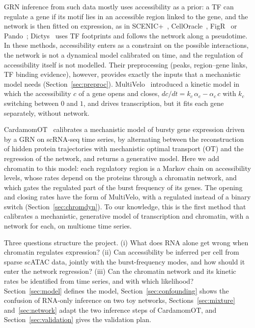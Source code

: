 \documentclass[a4paper, 11pt]{article}
\theoremstyle{plain}
\theoremstyle{remark}
\begin{document}
GRN inference from such data mostly uses accessibility as a prior: a TF can regulate a gene if its motif lies in an accessible region linked to the gene, and the network is then fitted on expression, as in SCENIC+~\cite{bravo2023scenicplus}, CellOracle~\cite{kamimoto2023celloracle}, FigR~\cite{kartha2022figr} or Pando~\cite{fleck2023pando}; Dictys~\cite{wang2023dictys} uses TF footprints and follows the network along a pseudotime. In these methods, accessibility enters as a constraint on the possible interactions, the network is not a dynamical model calibrated on time, and the regulation of accessibility itself is not modelled. Their preprocessing (peaks, region--gene links, TF binding evidence), however, provides exactly the inputs that a mechanistic model needs (Section~\ref{sec:preproc}). MultiVelo~\cite{li2023multivelo} introduced a kinetic model in which the accessibility $c$ of a gene opens and closes, $dc/dt = k_c\,\alpha_c - \alpha_c\,c$ with $k_c$ switching between $0$ and $1$, and drives transcription, but it fits each gene separately, without network.

CardamomOT~\cite{mauge2026cardamomot} calibrates a mechanistic model of bursty gene expression driven by a GRN on scRNA-seq time series, by alternating between the reconstruction of hidden protein trajectories with mechanistic optimal transport (OT) and the regression of the network, and returns a generative model. Here we add chromatin to this model: each regulatory region is a Markov chain on accessibility levels, whose rates depend on the proteins through a chromatin network, and which gates the regulated part of the burst frequency of its genes. The opening and closing rates have the form of MultiVelo, with a regulated instead of a binary switch (Section~\ref{sec:chromdyn}). To our knowledge, this is the first method that calibrates a mechanistic, generative model of transcription and chromatin, with a network for each, on multiome time series.

Three questions structure the project. (i) What does RNA alone get wrong when chromatin regulates expression? (ii) Can accessibility be inferred per cell from sparse scATAC data, jointly with the burst-frequency modes, and how should it enter the network regression? (iii) Can the chromatin network and its kinetic rates be identified from time series, and with which likelihood? Section~\ref{sec:model} defines the model, Section~\ref{sec:confounding} shows the confusion of RNA-only inference on two toy networks, Sections~\ref{sec:mixture} and~\ref{sec:network} adapt the two inference steps of CardamomOT, and Section~\ref{sec:validation} gives the validation plan.
\end{document}

